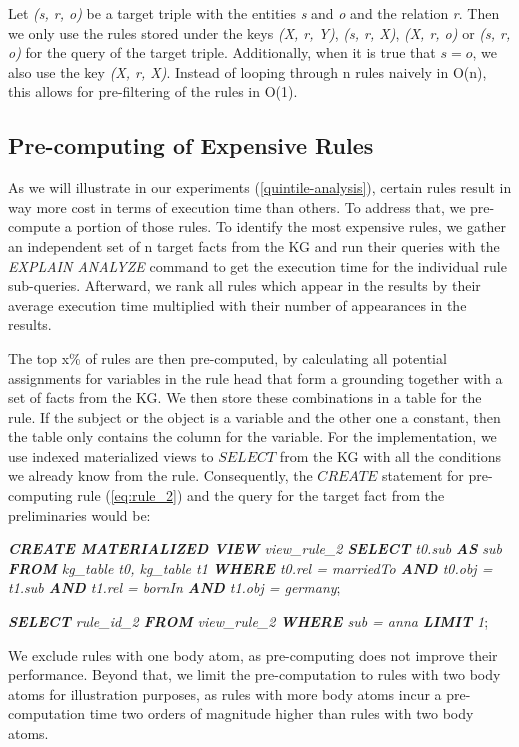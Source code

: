 \documentclass[english]{lni}
\begin{document}
Let \textit{(s, r, o)} be a target triple with the entities \textit{s} and \textit{o} and the relation \textit{r}. Then we only use the rules stored under the keys \textit{(X, r, Y)}, \textit{(s, r, X)}, \textit{(X, r, o)} or \textit{(s, r, o)} for the query of the target triple. Additionally, when it is true that \(s=o\), we also use the key \textit{(X, r, X)}. Instead of looping through n rules naively in O(n), this allows for pre-filtering of the rules in O(1).

\subsection{Pre-computing of Expensive Rules}
\label{pre-computation}
As we will illustrate in our experiments (\ref{quintile-analysis}), certain rules result in way more cost in terms of execution time than others. To address that, we pre-compute a portion of those rules. To identify the most expensive rules, we gather an independent set of n target facts from the KG and run their queries with the \textit{EXPLAIN ANALYZE} command to get the execution time for the individual rule sub-queries. Afterward, we rank all rules which appear in the results by their average execution time multiplied with their number of appearances in the results. 

The top x\% of rules are then pre-computed, by calculating all potential assignments for variables in the rule head that form a grounding together with a set of facts from the KG. We then store these combinations in a table for the rule. If the subject or the object is a variable and the other one a constant, then the table only contains the column for the variable. For the implementation, we use indexed materialized views to \(SELECT\) from the KG with all the conditions we already know from the rule. Consequently, the \(CREATE\) statement for pre-computing rule (\ref{eq:rule_2}) and the query for the target fact from the preliminaries would be: 

\textit{\textbf{CREATE MATERIALIZED VIEW} view\_rule\_2 \textbf{SELECT} t0.sub \textbf{AS} sub \textbf{FROM} kg\_table t0,  kg\_table t1 \textbf{WHERE} t0.rel = marriedTo \textbf{AND} t0.obj = t1.sub \textbf{AND} t1.rel = bornIn \textbf{AND} t1.obj = germany};


\textit{\textbf{SELECT} rule\_id\_2 \textbf{FROM} view\_rule\_2  \textbf{WHERE} sub = anna \textbf{LIMIT} 1};

We exclude rules with one body atom, as pre-computing does not improve their performance. Beyond that, we limit the pre-computation to rules with two body atoms for illustration purposes, as rules with more body atoms incur a pre-computation time two orders of magnitude higher than rules with two body atoms.
\end{document}
